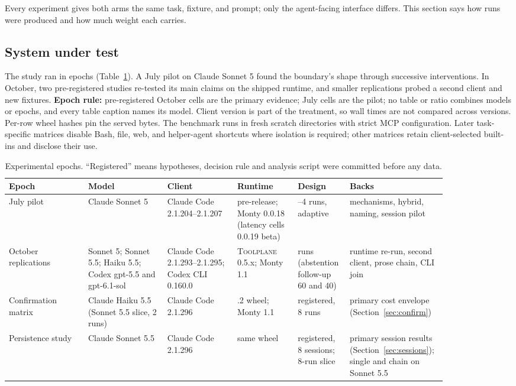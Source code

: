 \documentclass[10pt,twocolumn]{article}
\newcommand{\toolplane}{\textsc{Toolplane}\xspace}
\begin{document}
Every experiment gives both arms the same task, fixture, and prompt; only the
agent-facing interface differs.  This section says how runs were produced and
how much weight each carries.

\subsection{System under test}

The study ran in epochs (Table~\ref{tab:epochs}).  A July pilot on Claude
Sonnet 5 found the boundary's shape through successive interventions.  In
October, two pre-registered studies re-tested its main claims on the shipped
runtime, and smaller replications probed a second client and new fixtures.
\textbf{Epoch rule:} pre-registered October cells are the primary evidence;
July cells are the pilot; no table or ratio combines models or epochs, and
every table caption names its model.  Client version is part of the
treatment, so wall times are not compared across versions.  Per-row wheel
hashes pin the served bytes.  The benchmark runs in fresh scratch directories
with strict MCP configuration.  Later task-specific matrices disable Bash,
file, web, and helper-agent shortcuts where isolation is required; other
matrices retain client-selected built-ins and disclose their use.

\begin{table}[t]
\centering
\scriptsize
\caption{Experimental epochs.  ``Registered'' means hypotheses, decision rule
and analysis script were committed before any data.}
\label{tab:epochs}
\begin{tabular}{>{\raggedright\arraybackslash}p{0.17\linewidth}>{\raggedright\arraybackslash}p{0.17\linewidth}>{\raggedright\arraybackslash}p{0.15\linewidth}>{\raggedright\arraybackslash}p{0.13\linewidth}>{\raggedright\arraybackslash}p{0.10\linewidth}>{\raggedright\arraybackslash}p{0.14\linewidth}}
\toprule
Epoch & Model & Client & Runtime & Design & Backs \\
\midrule
July pilot & Claude Sonnet 5 & Claude Code 2.1.204--2.1.207 & pre-release; Monty 0.0.18 (latency cells 0.0.19 beta) & 2--4 runs, adaptive & mechanisms, hybrid, naming, session pilot \\
October replications & Sonnet 5; Sonnet 5.5; Haiku 5.5; Codex gpt-5.5 and gpt-6.1-sol & Claude Code 2.1.293--2.1.295; Codex CLI 0.160.0 & \toolplane 0.5.x; Monty 1.1 & 4 runs (abstention follow-up 60 and 40) & runtime re-run, second client, prose chain, CLI join \\
Confirmation matrix & Claude Haiku 5.5 (Sonnet 5.5 slice, 2 runs) & Claude Code 2.1.296 & 0.5.2 wheel; Monty 1.1 & registered, 8 runs & primary cost envelope (Section~\ref{sec:confirm}) \\
Persistence study & Claude Sonnet 5.5 & Claude Code 2.1.296 & same wheel & registered, 8 sessions; 8-run slice & primary session results (Section~\ref{sec:sessions}); single and chain on Sonnet 5.5 \\
\bottomrule
\end{tabular}
\end{table}
\end{document}
